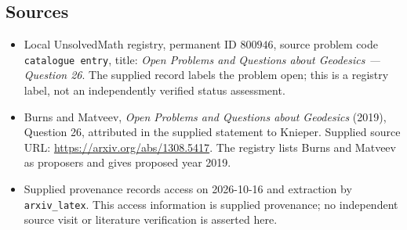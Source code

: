 \documentclass[11pt]{article}
\begin{document}
\subsection{Sources}
\begin{itemize}
\item Local UnsolvedMath registry, permanent ID \(800946\), source problem code \texttt{catalogue entry}, title: \emph{Open Problems and Questions about Geodesics --- Question 26}. The supplied record labels the problem open; this is a registry label, not an independently verified status assessment.
\item Burns and Matveev, \emph{Open Problems and Questions about Geodesics} (2019), Question 26, attributed in the supplied statement to Knieper. Supplied source URL: \url{https://arxiv.org/abs/1308.5417}. The registry lists Burns and Matveev as proposers and gives proposed year 2019.
\item Supplied provenance records access on 2026-10-16 and extraction by \texttt{arxiv\_latex}. This access information is supplied provenance; no independent source visit or literature verification is asserted here.
\end{itemize}
\end{document}
